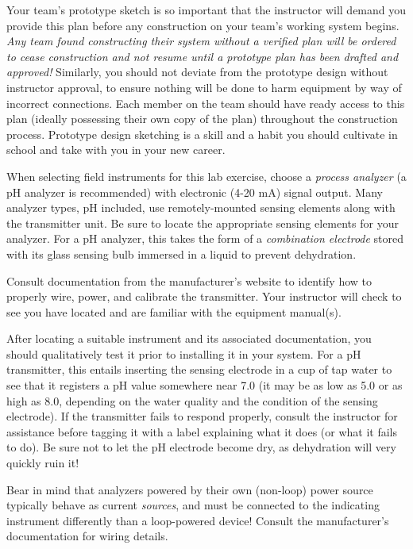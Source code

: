 Your team's prototype sketch is so important that the instructor will demand you provide this plan before any construction on your team's working system begins.  {\it Any team found constructing their system without a verified plan will be ordered to cease construction and not resume until a prototype plan has been drafted and approved!}  Similarly, you should not deviate from the prototype design without instructor approval, to ensure nothing will be done to harm equipment by way of incorrect connections.  Each member on the team should have ready access to this plan (ideally possessing their own copy of the plan) throughout the construction process.  Prototype design sketching is a skill and a habit you should cultivate in school and take with you in your new career.

\vskip 10pt

When selecting field instruments for this lab exercise, choose a {\it process analyzer} (a pH analyzer is recommended) with electronic (4-20 mA) signal output.  Many analyzer types, pH included, use remotely-mounted sensing elements along with the transmitter unit.  Be sure to locate the appropriate sensing elements for your analyzer.  For a pH analyzer, this takes the form of a {\it combination electrode} stored with its glass sensing bulb immersed in a liquid to prevent dehydration.

Consult documentation from the manufacturer's website to identify how to properly wire, power, and calibrate the transmitter.  Your instructor will check to see you have located and are familiar with the equipment manual(s).

After locating a suitable instrument and its associated documentation, you should qualitatively test it prior to installing it in your system.  For a pH transmitter, this entails inserting the sensing electrode in a cup of tap water to see that it registers a pH value somewhere near 7.0 (it may be as low as 5.0 or as high as 8.0, depending on the water quality and the condition of the sensing electrode).  If the transmitter fails to respond properly, consult the instructor for assistance before tagging it with a label explaining what it does (or what it fails to do).  Be sure not to let the pH electrode become dry, as dehydration will very quickly ruin it!

Bear in mind that analyzers powered by their own (non-loop) power source typically behave as current {\it sources}, and must be connected to the indicating instrument differently than a loop-powered device!  Consult the manufacturer's documentation for wiring details.

